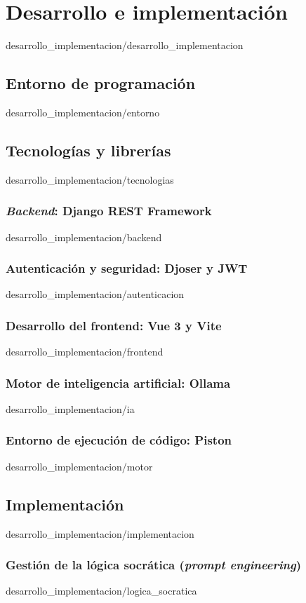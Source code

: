 \documentclass[epsbased,copyright,final,printable,covers,extendedindex,firstnumbered,tfg,gnuplot,lof,lot,loc]{tfgtfmthesisuam}
\begin{document}
\chapter{Desarrollo e implementación\label{CAP:DESARROLLO}}{desarrollo_implementacion/desarrollo_implementacion}
  \section{Entorno de programación\label{SEC:DI_ENTORNO}}{desarrollo_implementacion/entorno}
  \section{Tecnologías y librerías\label{SEC:DI_TECNOLOGIAS}}{desarrollo_implementacion/tecnologias}
    \subsection{\textit{Backend}: Django REST Framework\label{SS:DI_TEC_BACKEND}}{desarrollo_implementacion/backend}
    \subsection{Autenticación y seguridad: Djoser y JWT\label{SS:DI_TEC_AUTH}}{desarrollo_implementacion/autenticacion}
    \subsection{Desarrollo del frontend: Vue 3 y Vite\label{SS:DI_TEC_FRONTEND}}{desarrollo_implementacion/frontend}
    \subsection{Motor de inteligencia artificial: Ollama\label{SS:DI_TEC_IA}}{desarrollo_implementacion/ia}
    \subsection{Entorno de ejecución de código: Piston\label{SS:DI_TEC_MOTOR}}{desarrollo_implementacion/motor}
  \section{Implementación\label{SEC:DI_IMPLEMENTACION}}{desarrollo_implementacion/implementacion}
    \subsection{Gestión de la lógica socrática (\textit{prompt engineering})\label{SS:DI_IMP_PROMPTS}}{desarrollo_implementacion/logica_socratica}
\end{document}
